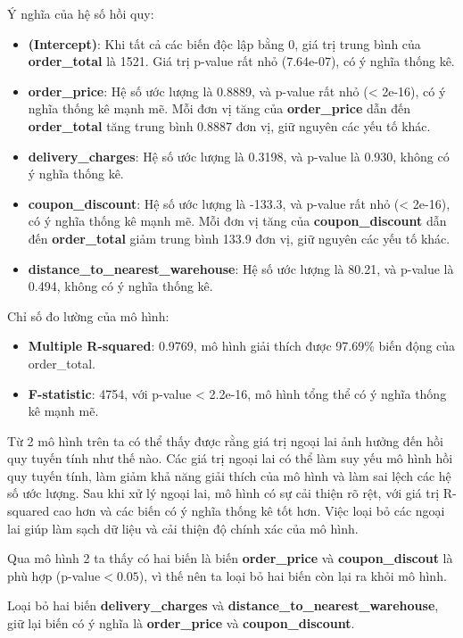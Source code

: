 Ý nghĩa của hệ số hồi quy:
\begin{itemize}
\item\textbf{(Intercept)}: Khi tất cả các biến độc lập bằng 0, giá trị trung bình của \textbf{order\_total} là 1521. Giá trị p-value rất nhỏ (7.64e-07), có ý nghĩa thống kê.
\item\textbf{order\_price}: Hệ số ước lượng là 0.8889, và p-value rất nhỏ (< 2e-16), có ý nghĩa thống kê mạnh mẽ. Mỗi đơn vị tăng của \textbf{order\_price} dẫn đến \textbf{order\_total} tăng trung bình 0.8887 đơn vị, giữ nguyên các yếu tố khác.
\item\textbf{delivery\_charges}: Hệ số ước lượng là 0.3198, và p-value là 0.930, không có ý nghĩa thống kê.
\item\textbf{coupon\_discount}: Hệ số ước lượng là -133.3, và p-value rất nhỏ (< 2e-16), có ý nghĩa thống kê mạnh mẽ. Mỗi đơn vị tăng của \textbf{coupon\_discount} dẫn đến \textbf{order\_total} giảm trung bình 133.9 đơn vị, giữ nguyên các yếu tố khác.
\item\textbf{distance\_to\_nearest\_warehouse}: Hệ số ước lượng là 80.21, và p-value là 0.494, không có ý nghĩa thống kê.
\end{itemize}

Chỉ số đo lường của mô hình:

\begin{itemize}
\item\textbf{Multiple R-squared}: 0.9769, mô hình giải thích được 97.69\% biến động của order\_total.
\item\textbf{F-statistic}: 4754, với p-value < 2.2e-16, mô hình tổng thể có ý nghĩa thống kê mạnh mẽ.
\end{itemize}

Từ 2 mô hình trên ta có thể thấy được rằng giá trị ngoại lai ảnh hưởng đến hồi quy tuyến tính như thế nào. Các giá trị ngoại lai có thể làm suy yếu mô hình hồi quy tuyến tính, làm giảm khả năng giải thích của mô hình và làm sai lệch các hệ số ước lượng. Sau khi xử lý ngoại lai, mô hình có sự cải thiện rõ rệt, với giá trị R-squared cao hơn và các biến có ý nghĩa thống kê tốt hơn. Việc loại bỏ các ngoại lai giúp làm sạch dữ liệu và cải thiện độ chính xác của mô hình.

Qua mô hình 2 ta thấy có hai biến là biến \textbf{order\_price} và \textbf{coupon\_discout} là phù hợp (p-value$<0.05$), vì thế nên ta loại bỏ hai biến còn lại ra khỏi mô hình.

Loại bỏ hai biến \textbf{delivery\_charges} và \textbf{distance\_to\_nearest\_warehouse}, giữ lại biến có ý nghĩa là \textbf{order\_price} và \textbf{coupon\_discount}.

